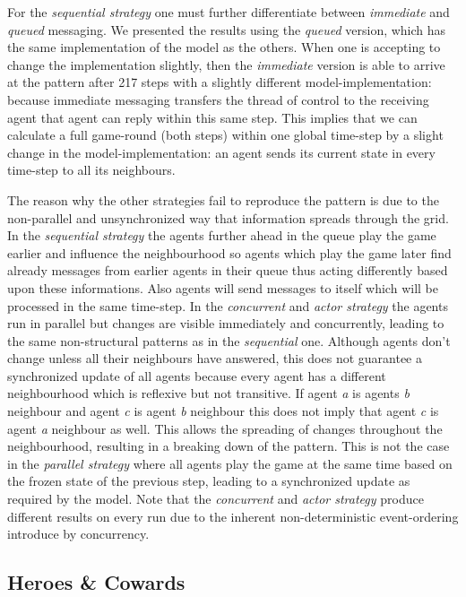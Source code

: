 For the \textit{sequential strategy} one must further differentiate between \textit{immediate} and \textit{queued} messaging. We presented the results using the \textit{queued} version, which has the same implementation of the model as the others. When one is accepting to change the implementation slightly, then the \textit{immediate} version is able to arrive at the pattern after 217 steps with a slightly different model-implementation: because immediate messaging transfers the thread of control to the receiving agent that agent can reply within this same step. This implies that we can calculate a full game-round (both steps) within one global time-step by a slight change in the model-implementation: an agent sends its current state in every time-step to all its neighbours.

The reason why the other strategies fail to reproduce the pattern is due to the non-parallel and unsynchronized way that information spreads through the grid. In the \textit{sequential strategy} the agents further ahead in the queue play the game earlier and influence the neighbourhood so agents which play the game later find already messages from earlier agents in their queue thus acting differently based upon these informations. Also agents will send messages to itself which will be processed in the same time-step. In the \textit{concurrent} and \textit{actor strategy} the agents run in parallel but changes are visible immediately and concurrently, leading to the same non-structural patterns as in the \textit{sequential} one. Although agents don't change unless all their neighbours have answered, this does not guarantee a synchronized update of all agents because every agent has a different neighbourhood which is reflexive but not transitive. If agent \textit{a} is agents \textit{b} neighbour and agent \textit{c} is agent \textit{b} neighbour this does not imply that agent \textit{c} is agent \textit{a} neighbour as well. This allows the spreading of changes throughout the neighbourhood, resulting in a breaking down of the pattern.
This is not the case in the \textit{parallel strategy}  where all agents play the game at the same time based on the frozen state of the previous step, leading to a synchronized update as required by the model. Note that the \textit{concurrent} and \textit{actor strategy} produce different results on every run due to the inherent non-deterministic event-ordering introduce by concurrency.


\subsection{Heroes \& Cowards}
